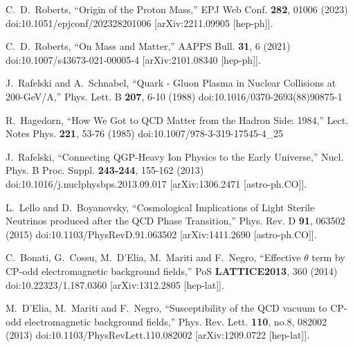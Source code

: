 \begin{thebibliography}{99}
C.~D.~Roberts,
``Origin of the Proton Mass,''
EPJ Web Conf. \textbf{282}, 01006 (2023)
doi:10.1051/epjconf/202328201006
[arXiv:2211.09905 [hep-ph]].

C.~D.~Roberts,
``On Mass and Matter,''
AAPPS Bull. \textbf{31}, 6 (2021)
doi:10.1007/s43673-021-00005-4
[arXiv:2101.08340 [hep-ph]].

J.~Rafelski and A.~Schnabel,
``Quark - Gluon Plasma in Nuclear Collisions at 200-{GeV}/A,''
Phys. Lett. B \textbf{207}, 6-10 (1988)
doi:10.1016/0370-2693(88)90875-1

R.~Hagedorn,
``How We Got to QCD Matter from the Hadron Side: 1984,''
Lect. Notes Phys. \textbf{221}, 53-76 (1985)
doi:10.1007/978-3-319-17545-4\_25

J.~Rafelski,
``Connecting QGP-Heavy Ion Physics to the Early Universe,''
Nucl. Phys. B Proc. Suppl. \textbf{243-244}, 155-162 (2013)
doi:10.1016/j.nuclphysbps.2013.09.017
[arXiv:1306.2471 [astro-ph.CO]].

L.~Lello and D.~Boyanovsky,
``Cosmological Implications of Light Sterile Neutrinos produced after the QCD Phase Transition,''
Phys. Rev. D \textbf{91}, 063502 (2015)
doi:10.1103/PhysRevD.91.063502
[arXiv:1411.2690 [astro-ph.CO]].

C.~Bonati, G.~Cossu, M.~D'Elia, M.~Mariti and F.~Negro,
``Effective $\theta$ term by CP-odd electromagnetic background fields,''
PoS \textbf{LATTICE2013}, 360 (2014)
doi:10.22323/1.187.0360
[arXiv:1312.2805 [hep-lat]].

M.~D'Elia, M.~Mariti and F.~Negro,
``Susceptibility of the QCD vacuum to CP-odd electromagnetic background fields,''
Phys. Rev. Lett. \textbf{110}, no.8, 082002 (2013)
doi:10.1103/PhysRevLett.110.082002
[arXiv:1209.0722 [hep-lat]].


\end{thebibliography}
